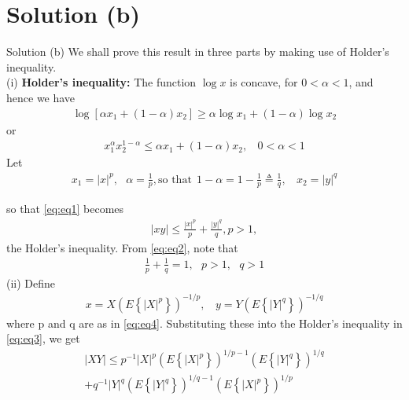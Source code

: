 \documentclass{beamer}
\providecommand{\sbrak}[1]{\ensuremath{{}\left[#1\right]}}
\providecommand{\brak}[1]{\ensuremath{\left(#1\right)}}
\providecommand{\cbrak}[1]{\ensuremath{\left\{#1\right\}}}
\theoremstyle{remark}
\numberwithin{equation}{section}
\numberwithin{figure}{section}
\numberwithin{table}{section}
\begin{document}
\section{Solution (b)}
\begin{frame}{Solution (b)}  
We shall prove this result in three parts by making use of Holder's inequality.\\
(i)\textbf{ Holder's inequality:} The function $\log x$ is concave, for $0<\alpha<1$, and hence we have
\begin{align*}
  \log \sbrak{\alpha x_1+(1-\alpha)x_2} \geq \alpha \log x_1+(1-\alpha)\log x_2
\end{align*}
or
\begin{align}
  x_1^\alpha x_2^{1-\alpha} \leq \alpha x_1 + (1-\alpha)x_2,~~~~ 0<\alpha<1
  \label{eq:eq1}
\end{align}
Let
\begin{align}
  x_1 = |x|^p,~~~\alpha = \frac{1}{p}, \text{so that}~~ 1-\alpha = 1-\frac{1}{p} \triangleq \frac{1}{q},~~~~x_2 = |y|^q
  \label{eq:eq2}
\end{align}
\end{frame}
\begin{frame}
  so that \eqref{eq:eq1} becomes
  \begin{align}
    |xy| \leq \frac{|x|^p}{p} + \frac{|y|^q}{q}, p>1,
    \label{eq:eq3}
  \end{align}
  the Holder's inequality. From \eqref{eq:eq2}, note that
  \begin{align}
    \frac{1}{p} + \frac{1}{q} = 1, ~~~ p>1, ~~~ q>1
    \label{eq:eq4}
  \end{align}
  (ii) Define
  \begin{align*}
    x = X\brak{E\cbrak{|X|^p}}^{-1/p},~~~~ y = Y\brak{E\cbrak{|Y|^q}}^{-1/q}
  \end{align*}
  where p and q are as in \eqref{eq:eq4}. Substituting these into the Holder's inequality in \eqref{eq:eq3}, we get
  \begin{align}
    |XY| \leq p^{-1}|X|^p\brak{E\cbrak{|X|^p}}^{1/p-1}\brak{E\cbrak{|Y|^q}}^{1/q}\nonumber\\
    +q^{-1}|Y|^q\brak{E\cbrak{|Y|^q}}^{1/q-1}\brak{E\cbrak{|X|^p}}^{1/p}
    \label{eq:eq5}
  \end{align}
\end{frame}
\end{document}
